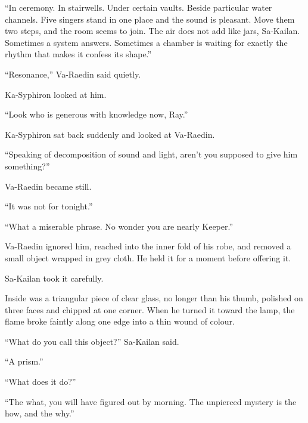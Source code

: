 “In ceremony.
In stairwells.
Under certain vaults.
Beside particular water channels.
Five singers stand in one place and the sound is pleasant.
Move them two steps, and the room seems to join.
The air does not add like jars, Sa-Kailan.
Sometimes a system answers.
Sometimes a chamber is waiting for exactly the rhythm that makes it confess its shape.”\par

“Resonance,” Va-Raedin said quietly.\par

Ka-Syphiron looked at him.\par

“Look who is generous with knowledge now, Ray.”\par




Ka-Syphiron sat back suddenly and looked at Va-Raedin.\par

“Speaking of decomposition of sound and light, aren’t you supposed to give him something?”\par

Va-Raedin became still.\par

“It was not for tonight.”\par

“What a miserable phrase.
No wonder you are nearly Keeper.”\par

Va-Raedin ignored him, reached into the inner fold of his robe, and removed a small object wrapped in grey cloth.
He held it for a moment before offering it.\par

Sa-Kailan took it carefully.\par

Inside was a triangular piece of clear glass, no longer than his thumb, polished on three faces and chipped at one corner.
When he turned it toward the lamp, the flame broke faintly along one edge into a thin wound of colour.\par

“What do you call this object?” Sa-Kailan said.\par

“A prism.”\par

“What does it do?”\par

“The what, you will have figured out by morning.
The unpierced mystery is the how, and the why.”\par

